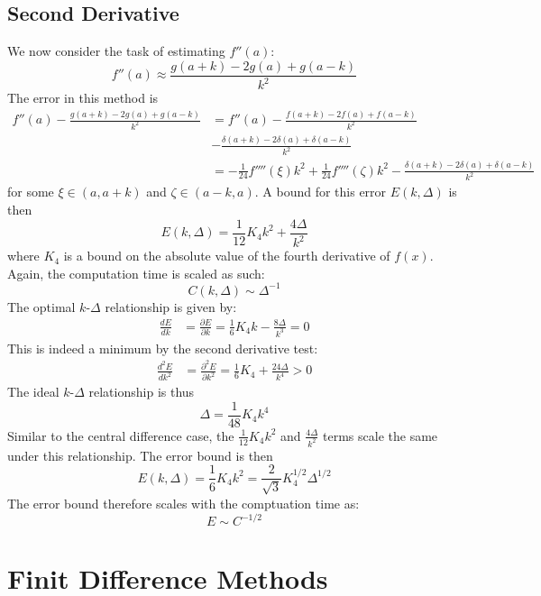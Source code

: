 \documentclass[letterpaper,11pt]{article}
\newcommand*{\deriv}[2]{\frac{d #1}{d #2}}
\newcommand*{\pderiv}[2]{\frac{\partial #1}{\partial #2}}
\newcommand*{\nderiv}[3]{\frac{d^{#3} #1}{d #2^{#3}}}
\newcommand*{\npderiv}[3]{\frac{\partial^{#3} #1}{\partial #2^{#3}}}
\begin{document}
\begin{flushleft}
    \subsection{Second Derivative}
    We now consider the task of estimating $f''(a)$:
    $$f''(a) \approx \frac{g(a+k) - 2g(a) + g(a-k)}{k^2}$$
    The error in this method is
    \begin{align*}
        f''(a) - \frac{g(a+k) - 2g(a) + g(a-k)}{k^2} &= f''(a) - \frac{f(a+k) - 2f(a) + f(a-k)}{k^2} \\ &- \frac{\delta(a+k) - 2\delta(a) + \delta(a-k)}{k^2} \\
        &= -\frac{1}{24}f''''(\xi)k^2 + \frac{1}{24}f''''(\zeta)k^2 - \frac{\delta(a+k) - 2\delta(a) + \delta(a-k)}{k^2}
    \end{align*}
    for some $\xi \in (a, a+k)$ and $\zeta \in (a-k, a)$. A bound for this error $E(k, \Delta)$ is then
    $$E(k, \Delta) = \frac{1}{12}K_4k^2 + \frac{4\Delta}{k^2}$$
    where $K_4$ is a bound on the absolute value of the fourth derivative of $f(x)$. Again, the computation time is scaled as such:
    $$\boxed{C(k, \Delta) \sim \Delta^{-1}}$$
    The optimal $k$-$\Delta$ relationship is given by:
    \begin{align*}
        \deriv{E}{k} &= \pderiv{E}{k} = \frac{1}{6}K_4k - \frac{8\Delta}{k^3} = 0
    \end{align*}
    This is indeed a minimum by the second derivative test:
    \begin{align*}
        \nderiv{E}{k}{2} &= \npderiv{E}{k}{2} = \frac{1}{6}K_4 + \frac{24\Delta}{k^4} > 0
    \end{align*}
    The ideal $k$-$\Delta$ relationship is thus
    $$\boxed{\Delta = \frac{1}{48}K_4k^4}$$
    Similar to the central difference case, the $\frac{1}{12}K_4k^2$ and $\frac{4\Delta}{k^2}$ terms scale the same under this relationship. The error bound is then
    $$\boxed{E(k, \Delta) = \frac{1}{6}K_4k^2 = \frac{2}{\sqrt{3}}K_4^{1/2}\Delta^{1/2}}$$
    The error bound therefore scales with the comptuation time as:
    $$\boxed{E \sim C^{-1/2}}$$

    \section{Finit Difference Methods}


\end{flushleft}
\end{document}
